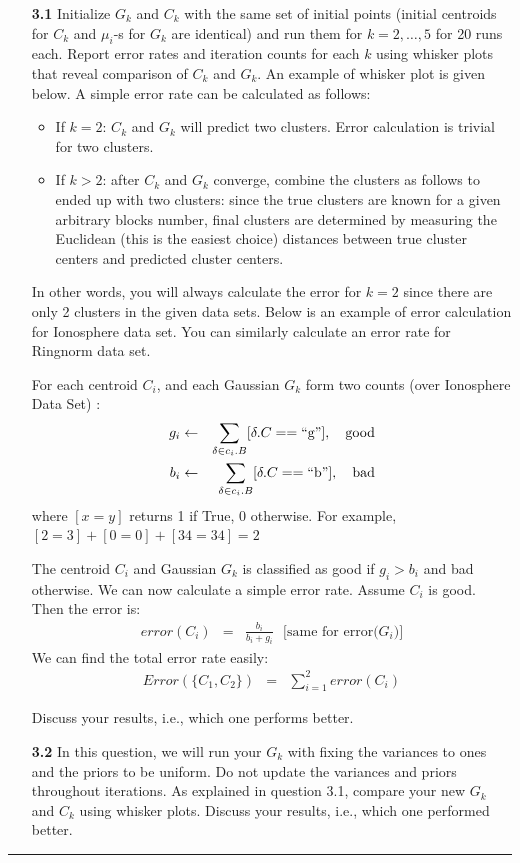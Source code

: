 \documentclass[a4paper,12pt]{article}
\newcommand{\quotes}[1]{``#1''}
\newcommand{\sep}{\begin{center}\textcolor{gray}{\rule{\textwidth}{0.75pt}}\end{center}}
\begin{document}
\begin{enumerate}
  \item[\textbf{3.1}]Initialize $G_k$ and $C_k$ with the same set of initial points (initial centroids  for $C_k$ and $\mu_i$-s for $G_k$  are identical) and run  them  for $k = 2,\ldots,5$ for 20 runs each. Report  error rates and iteration counts for each $k$ using whisker plots that reveal comparison of $C_k$ and $G_k$. An example of whisker plot is given below. A simple error rate can be calculated as follows:
  
  \begin{itemize}
  \item If $k =2$:  $C_k$ and $G_k$ will predict two clusters. Error calculation is trivial for two clusters.
  \item If $k>2$: after  $C_k$ and $G_k$ converge, combine the clusters as follows to ended up with two clusters: since the true clusters are known for a given arbitrary blocks
number, final clusters are determined by measuring the
Euclidean (this is the easiest choice) distances between
true cluster centers and predicted cluster centers.
  \end{itemize}
  
  In other words, you will always calculate the error for $k=2$ since there are only 2 clusters in the given data sets. Below is an example of error calculation for Ionosphere data set. You can  similarly calculate an error rate for Ringnorm data set.


 For each centroid $C_i$, and each Gaussian $G_k$ form two counts (over Ionosphere Data Set)  :
  \begin{eqnarray*}
  g_i &\gets& \sum_{\delta \in c_i.B} [\delta.C ==\text{\quotes{g}}],\ \ \ \mbox{\rm good}\\
  b_i &\gets& \sum_{\delta \in c_i.B} [\delta.C = =\text{\quotes{b}}], \ \ \ \mbox{\rm bad}
  \end{eqnarray*}
  where $[x = y]$ returns 1 if True, 0 otherwise.  For example, $[2 = 3] + [0 = 0] + [34 = 34] = 2$
  
  The centroid $C_i$  and Gaussian $G_k$ is classified as good if $g_i > b_i$ and bad otherwise.  We can now calculate a simple error rate.    Assume $C_i$ is good.  Then the error is:
 \begin{eqnarray*}
 error(C_i) &=& \frac{b_i}{b_i + g_i}\ \ \   \text{[same for error($G_i$)]}
 \end{eqnarray*}
 We can find the total error rate easily:
 \begin{eqnarray*}
 Error(\{C_1, C_2\}) &=& \sum_{i=1}^2 error(C_i)
 \end{eqnarray*}

  Discuss  your results, i.e., which one performs better.
  
  \item[\textbf{3.2}] In this question, we will run your $G_k$ with fixing the variances to ones and the priors to be uniform. Do not update the variances and priors throughout  iterations.  As explained in question 3.1,  compare  your new $G_k$  and $C_k$ using whisker plots. Discuss your results, i.e., which one performed better.
  
\end{enumerate}
\sep 
\end{document}
